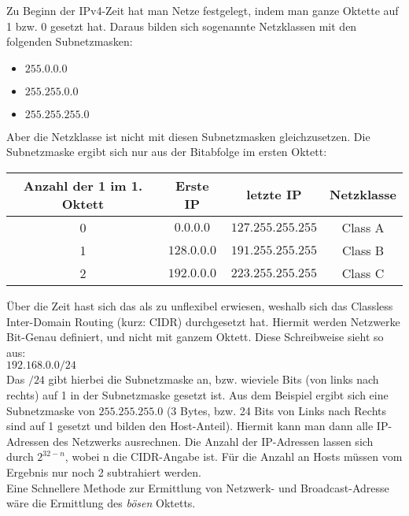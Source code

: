 \documentclass[a4paper, 12pt]{report}
\begin{document}
Zu Beginn der IPv4-Zeit hat man Netze festgelegt, indem man ganze Oktette auf 1
bzw. 0 gesetzt hat. Daraus bilden sich sogenannte Netzklassen mit den folgenden
Subnetzmasken: \\

\begin{itemize}
    \item $255.0.0.0$
    \item $255.255.0.0$
    \item $255.255.255.0$
\end{itemize}

Aber die Netzklasse ist nicht mit diesen Subnetzmasken gleichzusetzen. Die
Subnetzmaske ergibt sich nur aus der Bitabfolge im ersten Oktett:
\begin{center}
    \begin{tabular}{ | c | c | c | c | }
	\hline
	Anzahl der 1 im 1. Oktett & Erste IP & letzte IP & Netzklasse \\ \hline
	0 & $0.0.0.0$ & $127.255.255.255$ & Class A \\ \hline
	1 & $128.0.0.0$ & $191.255.255.255$ & Class B \\ \hline
	2 & $192.0.0.0$ & $223.255.255.255$ & Class C \\ \hline
    \end{tabular}
\end{center}

Über die Zeit hast sich das als zu unflexibel erwiesen, weshalb sich das
Classless Inter-Domain Routing (kurz: CIDR) durchgesetzt hat. Hiermit werden
Netzwerke Bit-Genau definiert, und nicht mit ganzem Oktett. Diese Schreibweise
sieht so aus: \\

$192.168.0.0/24$ \\

Das $/24$ gibt hierbei die Subnetzmaske an, bzw. wieviele Bits (von links nach
rechts) auf 1 in der Subnetzmaske gesetzt ist. Aus dem Beispiel ergibt sich eine
Subnetzmaske von $255.255.255.0$ (3 Bytes, bzw. 24 Bits von Links nach Rechts
sind auf 1 gesetzt und bilden den Host-Anteil). Hiermit kann man dann alle
IP-Adressen des Netzwerks ausrechnen. Die Anzahl der IP-Adressen lassen sich
durch $2^{32 - n}$, wobei n die CIDR-Angabe ist. Für die Anzahl an Hosts müssen
vom Ergebnis nur noch 2 subtrahiert werden. \\

Eine Schnellere Methode zur Ermittlung von Netzwerk- und Broadcast-Adresse wäre
die Ermittlung des \emph{bösen} Oktetts. \\
\end{document}
